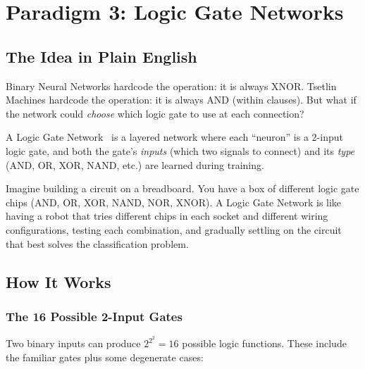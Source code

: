 \section{Paradigm 3: Logic Gate Networks}
\label{sec:lgn}

\subsection{The Idea in Plain English}

Binary Neural Networks hardcode the operation: it is always XNOR.
Tsetlin Machines hardcode the operation: it is always AND (within
clauses). But what if the network could \emph{choose} which logic
gate to use at each connection?

A Logic Gate Network~\cite{petersen2022difflogic} is a layered network where each ``neuron'' is
a 2-input logic gate, and both the gate's \emph{inputs} (which two
signals to connect) and its \emph{type} (AND, OR, XOR, NAND, etc.)
are learned during training.

\begin{analogy}
Imagine building a circuit on a breadboard. You have a box of
different logic gate chips (AND, OR, XOR, NAND, NOR, XNOR). A
Logic Gate Network is like having a robot that tries different chips
in each socket and different wiring configurations, testing each
combination, and gradually settling on the circuit that best solves
the classification problem.
\end{analogy}

\subsection{How It Works}

\subsubsection{The 16 Possible 2-Input Gates}

Two binary inputs can produce $2^{2^2} = 16$ possible logic functions.
These include the familiar gates plus some degenerate cases:

